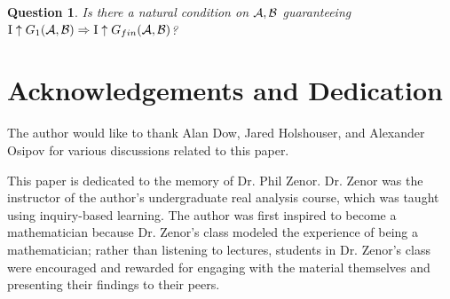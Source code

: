 \documentclass{amsart}
\theoremstyle{plain}
\newtheorem{question}[theorem]{Question}
\theoremstyle{definition}
\theoremstyle{remark}
\theoremstyle{plain}
\theoremstyle{definition}
\theoremstyle{remark}
\begin{document}
\begin{question}
Is there a natural condition on \(\mathcal{A},\mathcal{B}\) guaranteeing
\(\mathrm{I}\uparrow G_1(\mathcal{A},\mathcal{B})\Rightarrow\mathrm{I}\uparrow G_{fin}(\mathcal{A},\mathcal{B})\)?
\end{question}

\section{Acknowledgements and Dedication}

The author would like to thank Alan Dow, Jared Holshouser,
and Alexander Osipov for various discussions related to this paper.

This paper is dedicated to the memory of Dr. Phil Zenor. Dr. Zenor
was the instructor of the author's undergraduate real analysis course,
which was taught using inquiry-based learning.
The author was first inspired to become a mathematician because
Dr. Zenor's class modeled the experience of being a mathematician;
rather than listening to lectures, students in Dr. Zenor's class
were encouraged and rewarded for engaging with the material
themselves and presenting their findings to their peers.



\end{document}
